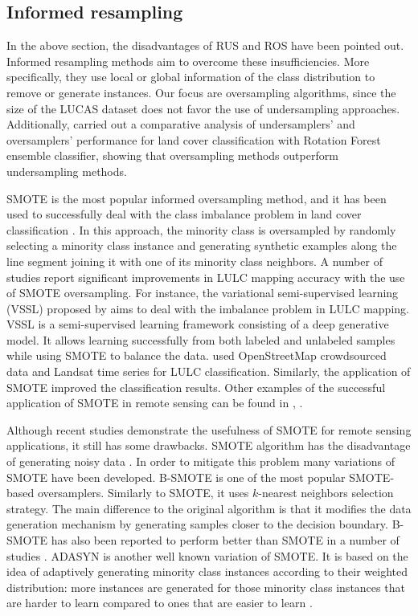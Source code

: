 \documentclass[remotesensing,article,submit,moreauthors,pdftex]{Definitions/mdpi}
\begin{document}
\subsection{Informed resampling}

In the above section, the disadvantages of RUS and ROS have been pointed out.
Informed resampling methods aim to overcome these insufficiencies. More
specifically, they use local or global information of the class distribution to
remove or generate instances. Our focus are oversampling algorithms, since the
size of the LUCAS dataset does not favor the use of undersampling approaches.
Additionally, \cite{Feng2018} carried out a comparative analysis of
undersamplers' and oversamplers' performance for land cover classification with
Rotation Forest ensemble classifier, showing that oversampling methods
outperform undersampling methods.

SMOTE is the most popular informed oversampling method, and it has been used to
successfully deal with the class imbalance problem in land cover classification
\cite{Cenggoro2018}. In this approach, the minority class is oversampled by
randomly selecting a minority class instance and generating synthetic examples
along the line segment joining it with one of its minority class neighbors. A
number of studies report significant improvements in LULC mapping accuracy with
the use of SMOTE oversampling. For instance, the variational semi-supervised
learning (VSSL) proposed by \cite{Cenggoro2018} aims to deal with the imbalance
problem in LULC mapping. VSSL is a semi-supervised learning framework consisting
of a deep generative model. It allows learning successfully from both labeled
and unlabeled samples while using SMOTE to balance the data. \cite{Johnson2016}
used OpenStreetMap crowdsourced data and Landsat time series for LULC
classification. Similarly, the application of SMOTE improved the classification
results. Other examples of the successful application of SMOTE in remote sensing
can be found in \cite{Bogner2018}, \cite{Panda2018}.

Although recent studies demonstrate the usefulness of SMOTE for remote sensing
applications, it still has some drawbacks. SMOTE algorithm has the disadvantage
of generating noisy data \cite{Douzas2017}. In order to mitigate this problem
many variations of SMOTE have been developed. B-SMOTE is one of the most popular
SMOTE-based oversamplers. Similarly to SMOTE, it uses $k$-nearest neighbors
selection strategy. The main difference to the original algorithm is that it
modifies the data generation mechanism by generating samples closer to the
decision boundary. B-SMOTE has also been reported to perform better than SMOTE
in a number of studies \cite{Nguyen2009, Ramentol2012}. ADASYN is another well
known variation of SMOTE. It is based on the idea of adaptively generating
minority class instances according to their weighted distribution: more
instances are generated for those minority class instances that are harder to
learn compared to ones that are easier to learn \cite{HaiboHe2008}.
\end{document}
